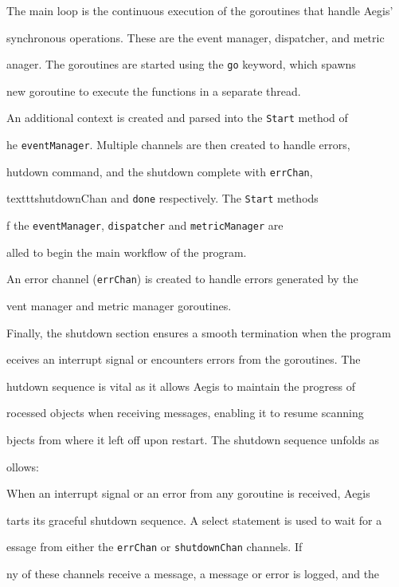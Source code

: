 \documentclass[12pt, conference, final, a4paper, onecolumn, compsoc]{IEEEtran}
\begin{document}


The main loop is the continuous execution of the goroutines that handle Aegis'

synchronous operations. These are the event manager, dispatcher, and metric

anager. The goroutines are started using the \texttt{go} keyword, which spawns

 new goroutine to execute the functions in a separate thread.

An additional context is created and parsed into the \texttt{Start} method of

he \texttt{eventManager}. Multiple channels are then created to handle errors,

hutdown command, and the shutdown complete with \texttt{errChan},

texttt{shutdownChan} and \texttt{done} respectively. The \texttt{Start} methods

f the \texttt{eventManager}, \texttt{dispatcher} and \texttt{metricManager} are

alled to begin the main workflow of the program.

An error channel (\texttt{errChan}) is created to handle errors generated by the

vent manager and metric manager goroutines.



Finally, the shutdown section ensures a smooth termination when the program

eceives an interrupt signal or encounters errors from the goroutines. The

hutdown sequence is vital as it allows Aegis to maintain the progress of

rocessed objects when receiving messages, enabling it to resume scanning

bjects from where it left off upon restart. The shutdown sequence unfolds as

ollows:

When an interrupt signal or an error from any goroutine is received, Aegis

tarts its graceful shutdown sequence. A select statement is used to wait for a

essage from either the \texttt{errChan} or \texttt{shutdownChan} channels. If

ny of these channels receive a message, a message or error is logged, and the
\end{document}
